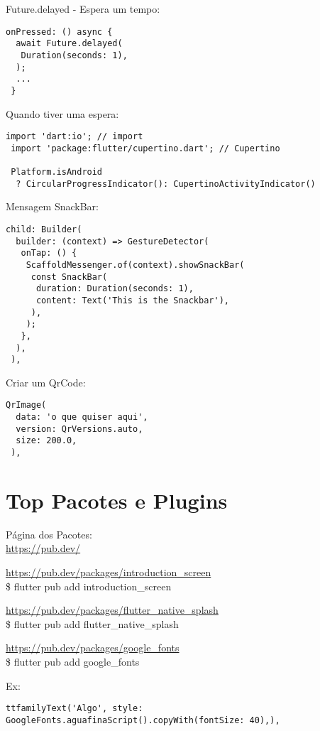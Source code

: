 \documentclass[11pt]{scrartcl}
\begin{document}
Future.delayed - Espera um tempo:
\begin{lstlisting}[]
 onPressed: () async {
  await Future.delayed(
   Duration(seconds: 1),
  );
  ...
 }
\end{lstlisting}

Quando tiver uma espera:
\begin{lstlisting}[]
 import 'dart:io'; // import
 import 'package:flutter/cupertino.dart'; // Cupertino

 Platform.isAndroid
  ? CircularProgressIndicator(): CupertinoActivityIndicator()
\end{lstlisting}

Mensagem SnackBar:
\begin{lstlisting}[]
 child: Builder(
  builder: (context) => GestureDetector(
   onTap: () {
    ScaffoldMessenger.of(context).showSnackBar(
     const SnackBar(
      duration: Duration(seconds: 1),
      content: Text('This is the Snackbar'),
     ),
    );
   },
  ),
 ),
\end{lstlisting}

Criar um QrCode:
\begin{lstlisting}[]
 QrImage(
  data: 'o que quiser aqui',
  version: QrVersions.auto,
  size: 200.0,
 ),
\end{lstlisting}


\section{Top Pacotes e Plugins}

Página dos Pacotes:
\\
\url{https://pub.dev/}

\url{https://pub.dev/packages/introduction_screen} \\
{\ttfamily\$ flutter pub add introduction\_screen}

\url{https://pub.dev/packages/flutter_native_splash} \\
{\ttfamily\$ flutter pub add flutter\_native\_splash}

\url{https://pub.dev/packages/google_fonts} \\
{\ttfamily\$ flutter pub add google\_fonts}

Ex: 
\begin{lstlisting}[]
 ttfamilyText('Algo', style: GoogleFonts.aguafinaScript().copyWith(fontSize: 40),),
\end{lstlisting}
\end{document}
